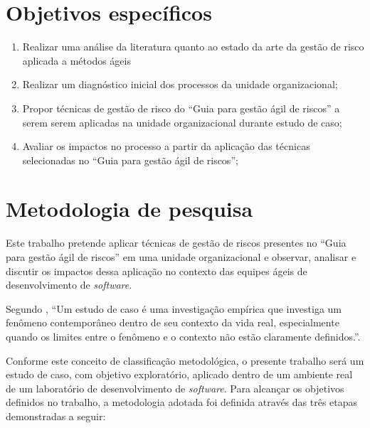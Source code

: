 \documentclass[
    12pt,       %
    openright,      %
    twoside,      %
    a4paper,      %
    english,      %
    french,       %
    spanish,      %
    brazil,       %
    ]{abntex2}
\begin{document}
\section{Objetivos específicos}
\begin{enumerate}
     \item Realizar uma análise da literatura quanto ao estado da arte da gestão de risco aplicada a métodos ágeis
    \item Realizar um diagnóstico inicial dos processos da unidade organizacional;
    \item Propor técnicas de gestão de risco do “Guia para gestão ágil de riscos” \cite{Vieira:2020} a serem serem aplicadas na unidade organizacional durante estudo de caso;
    \item Avaliar os impactos no processo a partir da aplicação das técnicas selecionadas no “Guia para gestão ágil de riscos”;
\end{enumerate}

\section{Metodologia de pesquisa}

Este trabalho pretende aplicar técnicas de gestão de riscos presentes no “Guia para gestão ágil de riscos”  \cite{Vieira:2020} em uma unidade organizacional e observar, analisar e discutir os impactos dessa aplicação no contexto das equipes ágeis de desenvolvimento de \textit{software}.

Segundo , “Um estudo de caso é uma investigação empírica que investiga um fenômeno contemporâneo dentro de seu contexto da vida real, especialmente quando os limites entre o fenômeno e o contexto não estão claramente
definidos.”. 

Conforme este conceito de classificação metodológica, o presente trabalho será um estudo de caso, com objetivo exploratório, aplicado dentro de um ambiente real de um laboratório de desenvolvimento de \textit{software}. Para alcançar os objetivos definidos no trabalho, a metodologia adotada foi definida através das três etapas demonstradas a seguir: 
\end{document}

